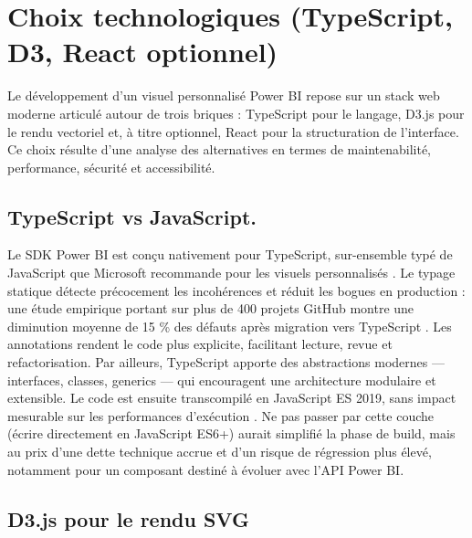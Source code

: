 \section{Choix technologiques (TypeScript, D3, React optionnel)}
\label{sec:techno}

Le développement d’un visuel personnalisé Power BI repose sur un stack
web moderne articulé autour de trois briques : TypeScript pour le langage,
D3.js pour le rendu vectoriel et, à titre optionnel, React pour la
structuration de l’interface. Ce choix résulte d’une analyse des
alternatives en termes de maintenabilité, performance, sécurité et
accessibilité.

\subsection{TypeScript vs JavaScript.}
Le SDK Power BI est conçu nativement pour TypeScript, sur-ensemble typé de
JavaScript que Microsoft recommande pour les visuels personnalisés
\parencite{MicrosoftPBISDKTS2025}. Le typage statique détecte précocement
les incohérences et réduit les bogues en production : une étude
empirique portant sur plus de 400 projets GitHub montre une diminution
moyenne de 15 \% des défauts après migration vers TypeScript
\parencite{BeyerEtAl2023}. Les annotations rendent le code plus explicite,
facilitant lecture, revue et refactorisation. Par ailleurs, TypeScript
apporte des abstractions modernes — interfaces, classes, generics —
qui encouragent une architecture modulaire et extensible. Le code est
ensuite transcompilé en JavaScript ES 2019, sans impact mesurable sur les
performances d’exécution \parencite{EcmaBenchmark2024}. Ne pas passer par
cette couche (écrire directement en JavaScript ES6+) aurait simplifié la
phase de build, mais au prix d’une dette technique accrue et d’un risque de
régression plus élevé, notamment pour un composant destiné à évoluer avec
l’API Power BI.

\subsection{D3.js pour le rendu SVG}

